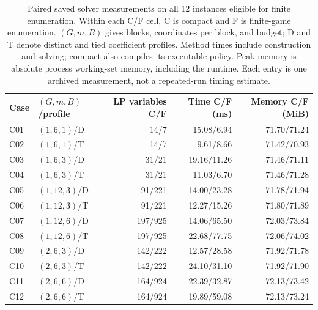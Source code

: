 \begin{table}[htbp]
\centering\small
\caption{Paired saved solver measurements on all 12 instances eligible for finite enumeration. Within each C/F cell, C is compact and F is finite-game enumeration. $(G,m,B)$ gives blocks, coordinates per block, and budget; D and T denote distinct and tied coefficient profiles. Method times include construction and solving; compact also compiles its executable policy. Peak memory is absolute process working-set memory, including the runtime. Each entry is one archived measurement, not a repeated-run timing estimate.}
\label{tab:risk_paired_solvers}
\begin{tabular}{llrrr}
\toprule
Case & $(G,m,B)$/profile & LP variables C/F & Time C/F (ms) & Memory C/F (MiB)\\
\midrule
C01 & $(1,6,1)$/D & 14/7 & 15.08/6.94 & 71.70/71.24 \\
C02 & $(1,6,1)$/T & 14/7 & 9.61/8.66 & 71.42/70.93 \\
C03 & $(1,6,3)$/D & 31/21 & 19.16/11.26 & 71.46/71.11 \\
C04 & $(1,6,3)$/T & 31/21 & 11.03/6.70 & 71.46/71.28 \\
C05 & $(1,12,3)$/D & 91/221 & 14.00/23.28 & 71.78/71.94 \\
C06 & $(1,12,3)$/T & 91/221 & 12.27/15.26 & 71.80/71.89 \\
C07 & $(1,12,6)$/D & 197/925 & 14.06/65.50 & 72.03/73.84 \\
C08 & $(1,12,6)$/T & 197/925 & 22.68/77.75 & 72.06/74.02 \\
C09 & $(2,6,3)$/D & 142/222 & 12.57/28.58 & 71.92/71.78 \\
C10 & $(2,6,3)$/T & 142/222 & 24.10/31.10 & 71.92/71.90 \\
C11 & $(2,6,6)$/D & 164/924 & 22.39/32.87 & 72.13/73.42 \\
C12 & $(2,6,6)$/T & 164/924 & 19.89/59.08 & 72.13/73.24 \\
\bottomrule
\end{tabular}
\end{table}
